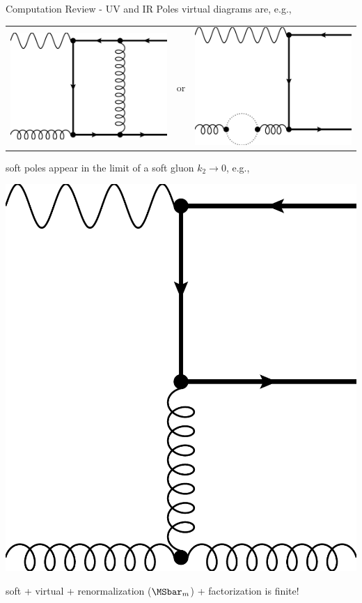 \begin{frame}{Computation Review - UV and IR Poles}
virtual diagrams are, e.g.,
\begin{center}
\begin{tabular}{wnw}
\includegraphics[width=.25\textwidth]{img/nlo-v-1}
&or
&\includegraphics[width=.25\textwidth]{img/nlo-v-5}
\end{tabular}
\end{center}

soft poles appear in the limit of a soft gluon $k_2\rightarrow 0$, e.g.,
\begin{center}
\includegraphics[width=.2\textwidth]{img/nlo-g-4}
\end{center}

soft + virtual + renormalization ($\MSbar_m$) + factorization is finite!
\end{frame}

